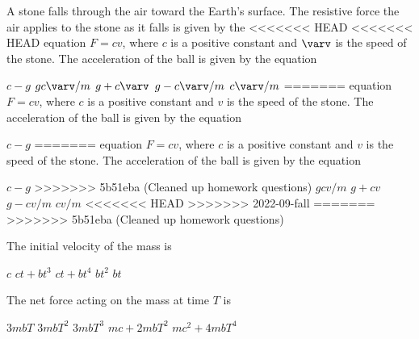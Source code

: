 \documentclass{../../oss-apphys-exam}
\begin{document}
\begin{multicols*}{2}
\begin{questions}
    \question A stone falls through the air toward the Earth's surface. The
    resistive force the air applies to the stone as it falls is given by the
<<<<<<< HEAD
<<<<<<< HEAD
    equation $F=cv$, where $c$ is a positive constant and $\varv$ is the speed
    of the stone. The acceleration of the ball is given by the equation
    \begin{choices}
      \choice $c-g$
      \choice $gc\varv/m$
      \choice $g+c\varv$
      \choice $g-c\varv/m$
      \choice $c\varv/m$
=======
    equation $F=cv$, where $c$ is a positive constant and $v$ is the speed
    of the stone. The acceleration of the ball is given by the equation
    \begin{choices}
      \choice $c-g$
=======
    equation $F=cv$, where $c$ is a positive constant and $v$ is the speed
    of the stone. The acceleration of the ball is given by the equation
    \begin{choices}
      \choice $c-g$
>>>>>>> 5b51eba (Cleaned up homework questions)
      \choice $gcv/m$
      \choice $g+cv$
      \choice $g-cv/m$
      \choice $cv/m$
<<<<<<< HEAD
>>>>>>> 2022-09-fall
=======
>>>>>>> 5b51eba (Cleaned up homework questions)
    \end{choices}
    

    \question The initial velocity of the mass is
    \begin{choices}
      \choice $c$
      \choice $ct+bt^3$
      \choice $ct+bt^4$
      \choice $bt^2$
      \choice $bt$
    \end{choices}
    \label{q:striaght1}

    \question The net force acting on the mass at time $T$ is
    \begin{choices}
      \choice $3mbT$
      \choice $3mbT^2$
      \choice $3mbT^3$
      \choice $mc+2mbT^2$
      \choice $mc^2+4mbT^4$
    \end{choices}
    \label{q:striaght2}
    \columnbreak


\end{choices}
\end{choices}
\end{questions}
\end{multicols*}
\end{document}
